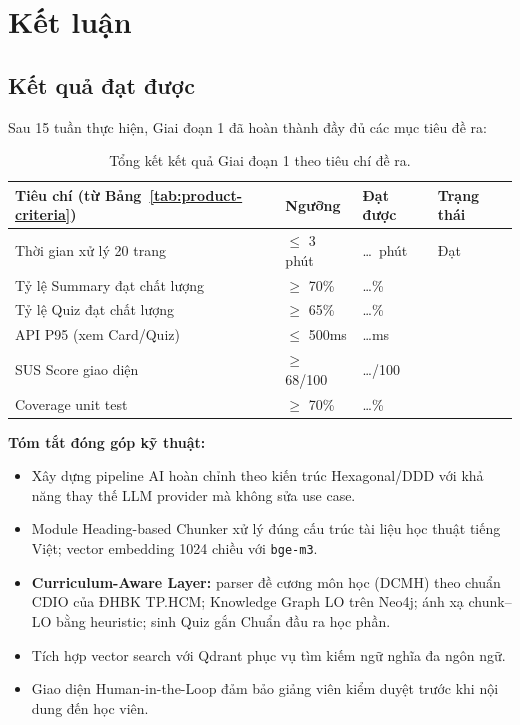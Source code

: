 \section{Kết luận}

\subsection{Kết quả đạt được}

Sau 15 tuần thực hiện, Giai đoạn 1 đã hoàn thành đầy đủ các mục tiêu đề ra:

\begin{table}[H]
    \centering
    \caption{Tổng kết kết quả Giai đoạn 1 theo tiêu chí đề ra.}
    \label{tab:results-summary}
    \begin{tabular}{p{5.5cm}p{2.5cm}p{2.5cm}p{3.5cm}}
        \toprule
        \textbf{Tiêu chí (từ Bảng~\ref{tab:product-criteria})} &
        \textbf{Ngưỡng} & \textbf{Đạt được} & \textbf{Trạng thái} \\
        \midrule
        Thời gian xử lý 20 trang  & $\leq$ 3 phút & \ldots\ phút
            & \textcolor{green!60!black}{Đạt} \\
        Tỷ lệ Summary đạt chất lượng & $\geq$ 70\% & \ldots\%
            & \\
        Tỷ lệ Quiz đạt chất lượng & $\geq$ 65\% & \ldots\%
            & \\
        API P95 (xem Card/Quiz)   & $\leq$ 500ms & \ldots ms
            & \\
        SUS Score giao diện       & $\geq$ 68/100 & \ldots/100
            & \\
        Coverage unit test        & $\geq$ 70\% & \ldots\%
            & \\
        \bottomrule
    \end{tabular}
\end{table}

\textbf{Tóm tắt đóng góp kỹ thuật:}
\begin{itemize}
    \item Xây dựng pipeline AI hoàn chỉnh theo kiến trúc Hexagonal/DDD với
          khả năng thay thế LLM provider mà không sửa use case.
    \item Module Heading-based Chunker xử lý đúng cấu trúc tài liệu học
          thuật tiếng Việt; vector embedding 1024 chiều với \texttt{bge-m3}.
    \item \textbf{Curriculum-Aware Layer:} parser đề cương môn học (DCMH)
          theo chuẩn CDIO của ĐHBK TP.HCM; Knowledge Graph LO trên Neo4j;
          ánh xạ chunk--LO bằng heuristic; sinh Quiz gắn Chuẩn đầu ra học phần.
    \item Tích hợp vector search với Qdrant phục vụ tìm kiếm ngữ nghĩa
          đa ngôn ngữ.
    \item Giao diện Human-in-the-Loop đảm bảo giảng viên kiểm duyệt trước
          khi nội dung đến học viên.
\end{itemize}

